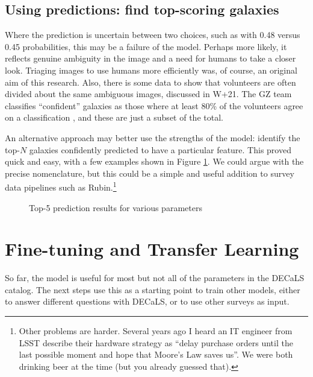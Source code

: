 \documentclass[preprint]{aastex631}
\begin{document}
\subsection{Using predictions: find top-scoring galaxies}

Where the prediction is uncertain between two choices, such as with 0.48 versus 0.45 probabilities, this may be a failure of the model. Perhaps more likely, it reflects genuine ambiguity in the image and a need for humans to take a closer look. Triaging images to use humans more efficiently was, of course, an original aim of this research. Also, there is some data to show that volunteers are often divided about the same ambiguous images, discussed in W+21. The GZ team classifies ``confident'' galaxies as those where at least 80\% of the volunteers agree on a classification \citep{2019MNRAS.484...93D}, and these are just a subset of the total.

An alternative approach may better use the strengths of the model: identify the top-$N$ galaxies confidently predicted to have a particular feature. This proved quick and easy, with a few examples shown in Figure \ref{fig:top5}. We could argue with the precise nomenclature, but this could be a simple and useful addition to survey data pipelines such as Rubin.\footnote{Other problems are harder. Several years ago I heard an IT engineer from LSST describe their hardware strategy as ``delay purchase orders until the last possible moment and hope that Moore's Law saves us''. We were both drinking beer at the time (but you already guessed that).}

\begin{figure}
	\caption{Top-5 prediction results for various parameters \label{fig:top5}}
\end{figure}


\section{Fine-tuning and Transfer Learning}

So far, the model is useful for most but not all of the parameters in the DECaLS catalog. The next steps use this as a starting point to train other models, either to answer different questions with DECaLS, or to use other surveys as input.
\end{document}
